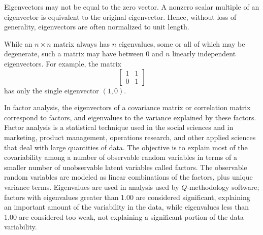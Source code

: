 Eigenvectors may not be equal to the zero vector. A nonzero scalar multiple of an eigenvector is equivalent to the original eigenvector. Hence, without loss of generality, eigenvectors are often normalized to unit length.

While an $n \times n$ matrix always has $n$ eigenvalues, some or all of which may be degenerate, such a matrix may have between 0 and $n$ linearly independent eigenvectors. For example, the matrix
\[
\begin{bmatrix}
1 & 1 \\
0 & 1
\end{bmatrix}
\]
has only the single eigenvector $(1,0)$. 

In factor analysis, the eigenvectors of a covariance matrix or correlation matrix correspond to factors, and eigenvalues to the variance explained by these factors. Factor analysis is a statistical technique used in the social sciences and in marketing, product management, operations research, and other applied sciences that deal with large quantities of data. The objective is to explain most of the covariability among a number of observable random variables in terms of a smaller number of unobservable latent variables called factors. The observable random variables are modeled as linear combinations of the factors, plus unique variance terms. Eigenvalues are used in analysis used by $Q$-methodology software; factors with eigenvalues greater than 1.00 are considered significant, explaining an important amount of the variability in the data, while eigenvalues less than 1.00 are considered too weak, not explaining a significant portion of the data variability.

